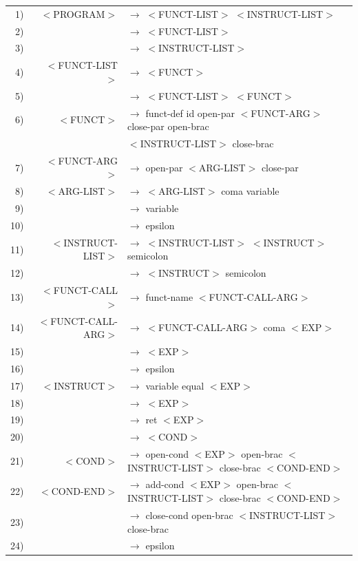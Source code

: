 \documentclass[a4paper,10pt]{article}
\begin{document}
\hspace{-3.0cm}\begin{tabular}{rrl}
1)&$<$PROGRAM$>$		& $\rightarrow$ $<$FUNCT-LIST$>$ $<$INSTRUCT-LIST$>$\\ 
2)&					& $\rightarrow$ $<$FUNCT-LIST$>$\\  
3)&					& $\rightarrow$ $<$INSTRUCT-LIST$>$\\  					
4)&$<$FUNCT-LIST$>$	& $\rightarrow$ $<$FUNCT$>$ \\ 
5)&					& $\rightarrow$ $<$FUNCT-LIST$>$ $<$FUNCT$>$\\ 				
6)&$<$FUNCT$>$			& $\rightarrow$ funct-def id open-par $<$FUNCT-ARG$>$ close-par open-brac \\
&						& $<$INSTRUCT-LIST$>$ close-brac \\  			
7)&$<$FUNCT-ARG$>$		& $\rightarrow$ open-par $<$ARG-LIST$>$ close-par\\  
8)&$<$ARG-LIST$>$		& $\rightarrow$ $<$ARG-LIST$>$ coma variable \\   
9)&					& $\rightarrow$ variable\\   
10)&					& $\rightarrow$ epsilon \\  

11)&$<$INSTRUCT-LIST$>$	& $\rightarrow$ $<$INSTRUCT-LIST$>$ $<$INSTRUCT$>$ semicolon\\ 
12)&					& $\rightarrow$ $<$INSTRUCT$>$ semicolon\\ 
					
13)&$<$FUNCT-CALL$>$	& $\rightarrow$ funct-name $<$FUNCT-CALL-ARG$>$\\ 

14)&$<$FUNCT-CALL-ARG$>$& $\rightarrow$ $<$FUNCT-CALL-ARG$>$ coma $<$EXP$>$\\ 
15)&					& $\rightarrow$ $<$EXP$>$\\ 
16)&					& $\rightarrow$ epsilon\\ 

17)&$<$INSTRUCT$>$		& $\rightarrow$ variable equal $<$EXP$>$\\ 
18)&					& $\rightarrow$ $<$EXP$>$\\
19)&					& $\rightarrow$ ret $<$EXP$>$\\
20)&					& $\rightarrow$ $<$COND$>$\\
					
21)&$<$COND$>$			& $\rightarrow$ open-cond $<$EXP$>$ open-brac $<$INSTRUCT-LIST$>$ close-brac $<$COND-END$>$\\



22)&$<$COND-END$>$		& $\rightarrow$ add-cond $<$EXP$>$ open-brac $<$INSTRUCT-LIST$>$ close-brac $<$COND-END$>$ \\
23)&					& $\rightarrow$ close-cond open-brac $<$INSTRUCT-LIST$>$ close-brac\\
24)&					& $\rightarrow$ epsilon \\
					

\end{tabular}
\end{document}
